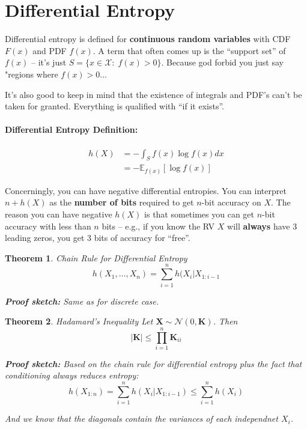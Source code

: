 \documentclass[a4paper,12pt]{report}
\newtheorem{theorem}{Theorem}
\begin{document}
\section{Differential Entropy}

Differential entropy is defined for \textbf{continuous random variables} with
CDF $F(x)$ and PDF $f(x)$. A term that often comes up is the ``support set'' of
$f(x)$ -- it's just $S = \{x\in \mathcal X : \; f(x) > 0\}$. Because god forbid you
just say "regions where $f(x)>0$...

It's also good to keep in mind that the existence of integrals and PDF's can't
be taken for granted. Everything is qualified with ``if it exists''. 


\paragraph{Differential Entropy Definition: } 
\begin{align}
	h(X) &= - \int_{S} f(x) \log f(x) dx \\ 
		 &= - \mathbb E_{f(x)} [\log f(x)] 
\end{align}

Concerningly, you can have negative differential entropies. You can interpret
$n+h(X)$ as the \textbf{number of bits} required to get $n$-bit accuracy on $X$.
The reason you can have negative $h(X)$ is that sometimes you can get $n$-bit
accuracy with less than $n$ bits -- e.g., if you know the RV $X$ will
\textbf{always} have 3 leading zeros, you get 3 bits of accuracy for ``free''. 








\begin{theorem}{Chain Rule for Differential Entropy}
\begin{equation}
	h(X_1, \dots, X_n) = \sum_{i=1}^{n} h(X_i | X_{1:i-1}
\end{equation}

\textbf{Proof sketch:} Same as for discrete case. 
\end{theorem}

\begin{theorem}{Hadamard's Inequality}
Let $\mathbf X \sim \mathcal N(0, \mathbf K)$. Then 
\begin{equation}
	|\mathbf K| \leq \prod_{i=1}^n \mathbf K_{ii}
\end{equation}

\textbf{Proof sketch:} Based on the chain rule for differential entropy plus the
fact that conditioning always reduces entropy: 
\begin{equation}
	h(X_{1:n}) = \sum_{i=1}^{n} h(X_i | X_{1:i-1}) \leq \sum_{i=1}^{n} h(X_i)
\end{equation}

And we know that the diagonals contain the variances of each independnet $X_i$.
\end{theorem}
\end{document}
